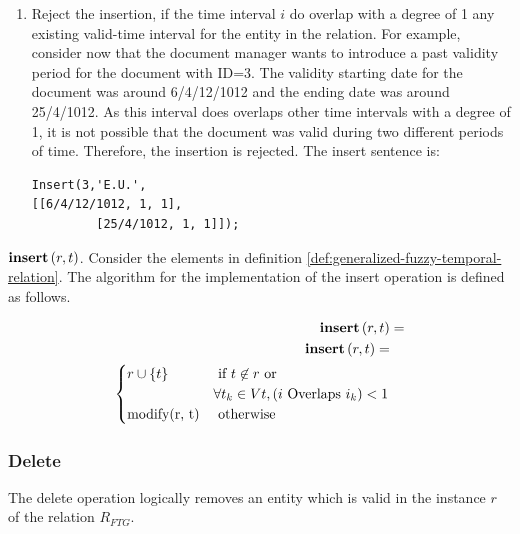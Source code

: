 \begin{enumerate}
\begin{enumerate}
	\item Reject the insertion, if the time interval $i$ do overlap with a degree of 1 any existing valid-time interval for the entity in the relation. For example, consider now that the document manager wants to introduce a past validity period for the document with ID=3. The validity starting date for the document was around 6/4/12/1012 and the ending date was around 25/4/1012. As this interval does overlaps other time intervals with a degree of 1, it is not possible that the document was valid during two different periods of time. Therefore, the insertion is rejected. The insert sentence is:

	      \begin{verbatim}
Insert(3,'E.U.',
[[6/4/12/1012, 1, 1],
         [25/4/1012, 1, 1]]);
	    \end{verbatim}
	\end{enumerate}

\end{enumerate}

\begin{definition}
 \emph{$\mbox{\textbf{insert}} \left(r, t \right)$}.
Consider the elements in definition \ref{def:generalized-fuzzy-temporal-relation}. The algorithm for the implementation of the insert operation is defined as follows.
\end{definition}




\begin{align}
\label{eq:insert-fuzzy-temporal}
\INS \left(r, t\right) &=\\
\INS \left(r, t\right) =\\
\begin{cases}
\nonumber
r \cup \lbrace t \rbrace
& \mbox{ if }  t \not \in r \mbox{ or }\\
\nonumber & \forall t_k \in Vt,  \left(i \mbox{ Overlaps } i_k\right) < 1\\
% 
\mbox{modify(r, t)} & \mbox{ otherwise }    %
\end{cases} 	
\end{align}
\subsubsection{\label{subsubsec:delete-fuzzy-temporal}Delete}
The delete operation logically removes an entity which is valid in the instance $r$ of the relation $R_{FTG}$.

